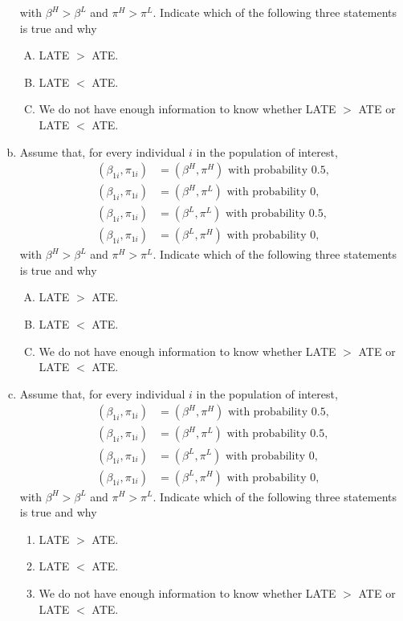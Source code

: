 \documentclass[11pt,letterpaper]{article}
\begin{document}
\begin{enumerate}[(a)]
	with $\beta^{H}>\beta^{L}$ and $\pi^{H}>\pi^{L}$. Indicate which of the following three statements is true and why
	\begin{enumerate}[A.]
		\item LATE $>$ ATE.
		\item LATE $<$ ATE.
		\item We do not have enough information to know whether LATE $>$ ATE or LATE $<$ ATE.
	\end{enumerate}
	\item  Assume that, for every individual $i$ in the population of interest,
	\begin{align*}
	(\beta_{1i},\pi_{1i})&=(\beta^{H},\pi^{H})\text{ with probability 0.5,}\\
	(\beta_{1i},\pi_{1i})&=(\beta^{H},\pi^{L})\text{ with probability 0,}\\
	(\beta_{1i},\pi_{1i})&=(\beta^{L},\pi^{L})\text{ with probability 0.5,}\\
	(\beta_{1i},\pi_{1i})&=(\beta^{L},\pi^{H})\text{ with probability 0,}
	\end{align*}
	with $\beta^{H}>\beta^{L}$ and $\pi^{H}>\pi^{L}$. Indicate which of the following three statements is true and why
	\begin{enumerate}[A.]
		\item LATE $>$ ATE.
		\item LATE $<$ ATE.
		\item We do not have enough information to know whether LATE $>$ ATE or LATE $<$ ATE.
	\end{enumerate}
	\item Assume that, for every individual $i$ in the population of interest,
	\begin{align*}
	(\beta_{1i},\pi_{1i})&=(\beta^{H},\pi^{H})\text{ with probability 0.5,}\\
	(\beta_{1i},\pi_{1i})&=(\beta^{H},\pi^{L})\text{ with probability 0.5,}\\
	(\beta_{1i},\pi_{1i})&=(\beta^{L},\pi^{L})\text{ with probability 0,}\\
	(\beta_{1i},\pi_{1i})&=(\beta^{L},\pi^{H})\text{ with probability 0,}
	\end{align*}
	with $\beta^{H}>\beta^{L}$ and $\pi^{H}>\pi^{L}$. Indicate which of the following three statements is true and why
	\begin{enumerate}
		\item LATE $>$ ATE.
		\item LATE $<$ ATE.
		\item We do not have enough information to know whether LATE $>$ ATE or LATE $<$ ATE.
	\end{enumerate}
\end{enumerate}
\end{document}
